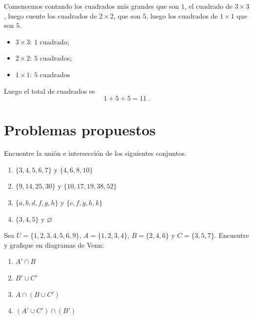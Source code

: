 \begin{solucion}
Comencemos contando los cuadrados más grandes que son $1$, el cuadrado de $3\times 3$, luego cuente los cuadrados de $2\times 2$, que son $5$, luego los cuadrados de $1\times 1$ que son $5$. 
\begin{itemize}
    \item $3\times 3$: $1$ cuadrado;
    \item $2\times 2$: $5$ cuadrados;
    \item $1\times 1$: $5$ cuadrados
\end{itemize}
Luego el total de cuadrados es
\[1+5+5=11\;.\]
\end{solucion}



\section{Problemas propuestos}
\begin{problema}
    Encuentre la unión e intersección de los siguientes conjuntos.
    \begin{multicols}{2}
    \renewcommand{\labelenumi}{\alph{enumi})}
    \begin{enumerate}
        \item $\{3,4,5,6,7\}$ y $\{4,6,8,10\}$
        \item $\{9,14,25,30\}$ y $\{10,17,19,38,52\}$
        \item $\{a,b,d,f,g,h\}$ y $\{c,f,g,h,k\}$
        \item $\{3,4,5\}$ y $\varnothing$
    \end{enumerate}   
    \end{multicols}    
\end{problema}

\begin{problema}
    Sea $U=\{1,2,3,4,5,6,9\}$, $A=\{1,2,3,4\}$, $B=\{2,4,6\}$ y $C=\{3,5,7\}$. Encuentre y grafique en diagramas de Venn:
    \begin{multicols}{2}
    \renewcommand{\labelenumi}{\alph{enumi})}
    \begin{enumerate}
        \item $A' \cap B$
        \item $B' \cup C'$
        \item $A \cap (B \cup C')$
        \item $(A' \cup C') \cap (B')$
        
    \end{enumerate}    
    \end{multicols}   
\end{problema}

